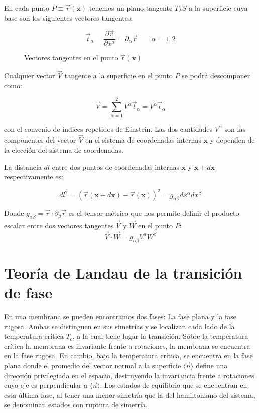 En cada punto $P\equiv\vec{r}(\mathbf{x})$ tenemos un plano tangente $T_PS$ a
la superficie cuya base son los siguientes vectores tangentes:

\begin{equation*}
\vec{t}_{\alpha}=\frac{\partial \vec{r}}{\partial
  x^{\alpha}}=\partial_{\alpha}\vec{r} \qquad \alpha=1,2
\end{equation*}

\begin{figure}[h]
\centering
 
\caption{Vectores tangentes en el punto $\vec{r}(\mathbf{x})$}
\end{figure}

Cualquier vector $\vec{V}$ tangente a la superficie en el punto $P$ se podrá
descomponer como:

\begin{equation*} 
\vec{V}=\sum^2_{\alpha=1}V^{\alpha}\vec{t}_{\alpha}=V^{\alpha}\vec{t}_{\alpha}
\end{equation*}

con el convenio de índices repetidos de Einstein. Las dos cantidades
$V^{\alpha}$ son las componentes del vector $\vec{V}$ en el sistema de
coordenadas internas $\mathbf{x}$ y dependen de la elección del sistema de
coordenadas.
 
La distancia $dl$ entre dos puntos de coordenadas internas $\mathbf{x}$ y
$\mathbf{x}+d\mathbf{x}$ respectivamente es:

\begin{equation*}
dl^2=(\vec{r}(\mathbf{x}+d\mathbf{x})-\vec{r}(\mathbf{x}))^2=g_{\alpha\beta}dx^{\alpha}dx^{\beta}
\end{equation*}

Donde $g_{\alpha\beta}=\vec{r}\cdot\partial_{\beta}\vec{r}$ es el tensor
métrico que nos permite definir el producto escalar entre dos vectores
tangentes $\vec{V}$ y $\vec{W}$ en el punto $P$:
\begin{equation*}
\vec{V}\cdot\vec{W}=g_{\alpha\beta}V^{\alpha}W^{\beta}
\end{equation*}


\section{Teoría de Landau de la transición de fase}

En una membrana se pueden encontramos dos fases: La fase plana y la fase
rugosa. Ambas se distinguen en sus simetrías y se localizan cada lado
de la temperatura crítica $T_c$, a la cual tiene lugar la transición. 
Sobre la temperatura crítica la membrana es invariante frente a rotaciones,
la membrana se encuentra en la fase rugosa. En cambio, bajo la temperatura
crítica, se encuentra en la fase 
plana donde el promedio del vector normal a la superficie
$\langle \vec{n}\rangle$ define una dirección privilegiada en el espacio,
destruyendo la invariancia frente a rotaciones cuyo eje es perpendicular a
$\langle \vec{n}\rangle$. Los estados de equilibrio que se encuentran en esta
última fase, al tener una menor simetría que la del hamiltoniano del sistema,
se denominan estados con ruptura de simetría.
 
